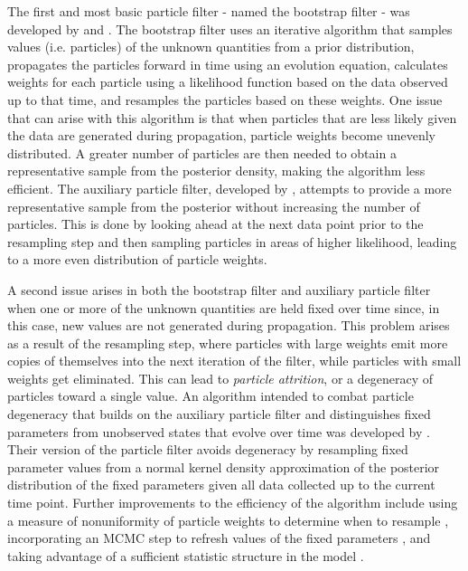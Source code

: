 \documentclass{elsarticle}
\begin{document}
The first and most basic particle filter - named the bootstrap filter - was developed by \citet{Gord:Salm:Smit:nove:1993} and \citet{Kita:mont:1996}. The bootstrap filter uses an iterative algorithm that samples values (i.e. particles) of the unknown quantities from a prior distribution, propagates the particles forward in time using an evolution equation, calculates weights for each particle using a likelihood function based on the data observed up to that time, and resamples the particles based on these weights. One issue that can arise with this algorithm is that when particles that are less likely given the data are generated during propagation, particle weights become unevenly distributed. A greater number of particles are then needed to obtain a representative sample from the posterior density, making the algorithm less efficient. The auxiliary particle filter, developed by \citet{Pitt:Shep:filt:1999}, attempts to provide a more representative sample from the posterior without increasing the number of particles.  This is done by looking ahead at the next data point prior to the resampling step and then sampling particles in areas of higher likelihood, leading to a more even distribution of particle weights.

A second issue arises in both the bootstrap filter and auxiliary particle filter when one or more of the unknown quantities are held fixed over time since, in this case, new values are not generated during propagation. This problem arises as a result of the resampling step, where particles with large weights emit more copies of themselves into the next iteration of the filter, while particles with small weights get eliminated. This can lead to \emph{particle attrition}, or a degeneracy of particles toward a single value. An algorithm intended to combat particle degeneracy that builds on the auxiliary particle filter and distinguishes fixed parameters from unobserved states that evolve over time was developed by \citet{Liu:West:comb:2001}. Their version of the particle filter avoids degeneracy by resampling fixed parameter values from a normal kernel density approximation of the posterior distribution of the fixed parameters given all data collected up to the current time point. Further improvements to the efficiency of the algorithm include using a measure of nonuniformity of particle weights to determine when to resample \citep{Douc:Capp:Moul:comp:2005}, incorporating an MCMC step to refresh values of the fixed parameters \citep{Gilk:Berz:foll:2001}, and taking advantage of a sufficient statistic structure in the model \citep{Fear:mark:2002}.
\end{document}

